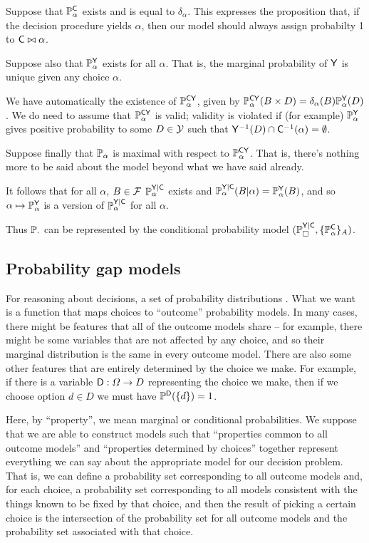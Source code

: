 Suppose that $\mathbb{P}_\alpha^{\mathsf{C}}$ exists and is equal to $\delta_{\alpha}$. This expresses the proposition that, if the decision procedure yields $\alpha$, then our model should always assign probabilty 1 to $\mathsf{C}\bowtie \alpha$.

Suppose also that $\mathbb{P}_\alpha^{\mathsf{Y}}$ exists for all $\alpha$. That is, the marginal probability of $\mathsf{Y}$ is unique given any choice $\alpha$. 

We have automatically the existence of $\mathbb{P}_\alpha^{\mathsf{CY}}$, given by $\mathbb{P}_\alpha^{\mathsf{CY}}(B\times D)=\delta_\alpha(B)\mathbb{P}_\alpha^{\mathsf{Y}}(D)$. We do need to assume that $\mathbb{P}_\alpha^{\mathsf{CY}}$ is valid; validity is violated if (for example) $\mathbb{P}_\alpha^{\mathsf{Y}}$ gives positive probability to some $D\in \mathcal{Y}$ such that $\mathsf{Y}^{-1}(D)\cap\mathsf{C}^{-1}(\alpha)=\emptyset$.

Suppose finally that $\mathbb{P}_\alpha$ is maximal with respect to $\mathbb{P}_\alpha^{\mathsf{CY}}$. That is, there's nothing more to be said about the model beyond what we have said already.

It follows that for all $\alpha$, $B\in \mathcal{F}$ $\mathbb{P}_\alpha^{\mathsf{Y}|\mathsf{C}}$ exists and $\mathbb{P}_\alpha^{\mathsf{Y}|\mathsf{C}}(B|\alpha)=\mathbb{P}^{\mathsf{Y}}_\alpha(B)$, and so $\alpha\mapsto \mathbb{P}^{\mathsf{Y}}_\alpha$ is a version of $\mathbb{P}_\alpha^{\mathsf{Y}|\mathsf{C}}$ for all $\alpha$.

Thus $\mathbb{P}_\cdot$ can be represented by the conditional probability model $(\mathbb{P}_\square^{\mathsf{Y}|\mathsf{C}},\{\mathbb{P}^{\mathsf{C}}_\alpha\}_A)$.

\subsection{Probability gap models}

For reasoning about decisions, a set of probability distributions . What we want is a function that maps choices to ``outcome'' probability models. In many cases, there might be features that all of the outcome models share -- for example, there might be some variables that are not affected by any choice, and so their marginal distribution is the same in every outcome model. There are also some other features that are entirely determined by the choice we make. For example, if there is a variable $\mathsf{D}:\Omega\to D$ representing the choice we make, then if we choose option $d\in D$ we must have $\mathbb{P}^{\mathsf{D}}(\{d\})=1$.

Here, by ``property'', we mean marginal or conditional probabilities. We suppose that we are able to construct models such that ``properties common to all outcome models'' and ``properties determined by choices'' together represent everything we can say about the appropriate model for our decision problem. That is, we can define a probability set corresponding to all outcome models and, for each choice, a probability set corresponding to all models consistent with the things known to be fixed by that choice, and then the result of picking a certain choice is the intersection of the probability set for all outcome models and the probability set associated with that choice.

